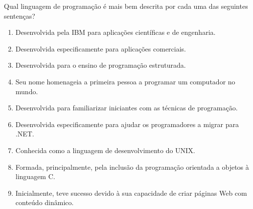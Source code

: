 \documentclass[12pt,a4paper]{article}
\begin{document}
\begin{enunciadoBox}[Enunciado]
Qual linguagem de programação é mais bem descrita por cada uma das seguintes sentenças?
\begin{enumerate}
  \item Desenvolvida pela IBM para aplicações científicas e de engenharia.
  \item Desenvolvida especificamente para aplicações comerciais.
  \item Desenvolvida para o ensino de programação estruturada.
  \item Seu nome homenageia a primeira pessoa a programar um computador no mundo.
  \item Desenvolvida para familiarizar iniciantes com as técnicas de programação.
  \item Desenvolvida especificamente para ajudar os programadores a migrar para .NET.
  \item Conhecida como a linguagem de desenvolvimento do UNIX.
  \item Formada, principalmente, pela inclusão da programação orientada a objetos à linguagem C.
  \item Inicialmente, teve sucesso devido à sua capacidade de criar páginas Web com conteúdo dinâmico.
\end{enumerate}
\end{enunciadoBox}

\bigskip
\end{document}
